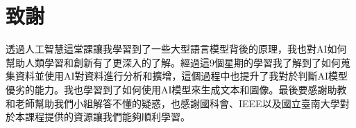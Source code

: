 \chapter*{致謝}
透過人工智慧這堂課讓我學習到了一些大型語言模型背後的原理，我也對AI如何幫助人類學習和創新有了更深入的了解。經過這9個星期的學習我了解到了如何蒐集資料並使用AI對資料進行分析和擴增，這個過程中也提升了我對於判斷AI模型優劣的能力。我也學習到了如何使用AI模型來生成文本和圖像。最後要感謝助教和老師幫助我們小組解答不懂的疑惑，也感謝國科會、IEEE以及國立臺南大學對於本課程提供的資源讓我們能夠順利學習。